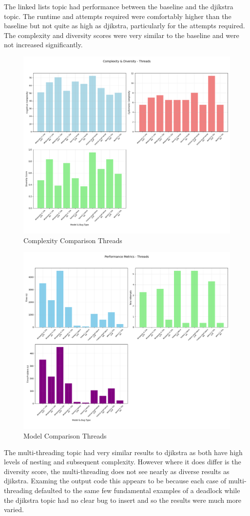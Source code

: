 \documentclass[12pt]{extarticle}
\begin{document}
The linked lists topic had performance between the baseline and the djikstra topic. The runtime and attempts required were comfortably higher than the baseline but not quite as high as djikstra, particularly for the attempts required. The complexity and diversity scores were very similar to the baseline and were not increased significantly. 

\begin{figure}[H]
\centering
\includegraphics[width=0.65\linewidth]{Images/Complexity_Comparison_Threads.png}
\caption{Complexity Comparison Threads}
\label{fig:Complexity_Comparison_Threads}
\end{figure}

\begin{figure}[H]
\centering
\includegraphics[width=0.65\linewidth]{Images/Model_Comparison_Threads.png}
\caption{Model Comparison Threads}
\label{fig:Model_Comparison_Threads}
\end{figure}



The multi-threading topic had very similar results to djikstra as both have high levels of nesting and subsequent complexity. However where it does differ is the diversity score, the multi-threading does not see nearly as diverse results as djikstra. Examing the output code this appears to be because each case of multi-threading defaulted to the same few fundamental examples of a deadlock while the djikstra topic had no clear bug to insert and so the results were much more varied.
\end{document}
